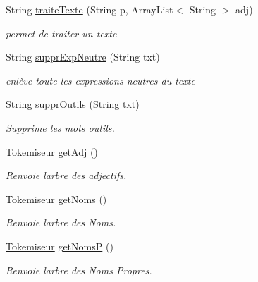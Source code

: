 \begin{DoxyCompactItemize}
\item 
String \hyperlink{classlemmatiseur_1_1_lefff_a334bd5292ddfbbd3b2abbbbb1cd5abfd}{traite\+Texte} (String p, Array\+List$<$ String $>$ adj)
\begin{DoxyCompactList}\small\item\em permet de traiter un texte \end{DoxyCompactList}\item 
String \hyperlink{classlemmatiseur_1_1_lefff_aefe143c79c4a9d5b47d7e0737a08b53b}{suppr\+Exp\+Neutre} (String txt)
\begin{DoxyCompactList}\small\item\em enlève toute les expressions neutres du texte \end{DoxyCompactList}\item 
String \hyperlink{classlemmatiseur_1_1_lefff_acb0f198179d03c9dfdf1fe42ed73d867}{suppr\+Outils} (String txt)
\begin{DoxyCompactList}\small\item\em Supprime les mots outils. \end{DoxyCompactList}\item 
\hyperlink{classtokemisation_1_1_tokemiseur}{Tokemiseur} \hyperlink{classlemmatiseur_1_1_lefff_ac22071c1aa33ecad84d6032887ea5372}{get\+Adj} ()
\begin{DoxyCompactList}\small\item\em Renvoie l\textquotesingle{}arbre des adjectifs. \end{DoxyCompactList}\item 
\hyperlink{classtokemisation_1_1_tokemiseur}{Tokemiseur} \hyperlink{classlemmatiseur_1_1_lefff_a74ea1dc022e573471a3dc05b01f7678b}{get\+Noms} ()
\begin{DoxyCompactList}\small\item\em Renvoie l\textquotesingle{}arbre des Noms. \end{DoxyCompactList}\item 
\hyperlink{classtokemisation_1_1_tokemiseur}{Tokemiseur} \hyperlink{classlemmatiseur_1_1_lefff_a2cae348bae569e1b5478c7d4999153e6}{get\+NomsP} ()
\begin{DoxyCompactList}\small\item\em Renvoie l\textquotesingle{}arbre des Noms Propres. \end{DoxyCompactList}\end{DoxyCompactItemize}
